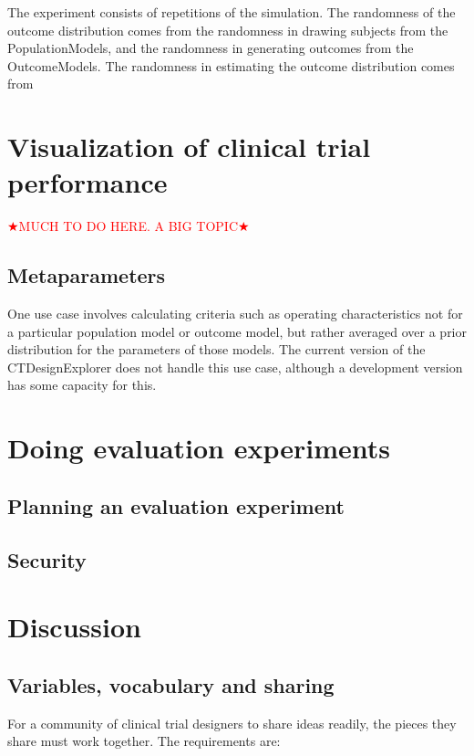\documentclass[12pt]{amsart}
\def\comment<#1>{\textcolor{red}{$\bigstar$#1$\bigstar$}}
\begin{document}
The experiment consists of repetitions of the simulation.
The randomness of the outcome distribution comes from the randomness
in drawing subjects from the PopulationModels, and the randomness in generating outcomes
from the OutcomeModels.
The randomness in estimating the outcome distribution comes from

\section{Visualization of clinical trial performance}

\comment<MUCH TO DO HERE. A BIG TOPIC>


\subsection{Metaparameters}

One use case involves calculating criteria such as operating characteristics not for a particular population model or outcome model, but rather averaged over a prior distribution for the parameters of those models. The current version of the CTDesignExplorer does not handle this use case, although a development version has some capacity for this.


\section{Doing evaluation experiments}

\subsection{Planning an evaluation experiment}

\subsection{Security}

\section{Discussion}

\subsection{Variables, vocabulary and sharing}

For a community of clinical trial designers to share ideas readily, 
the pieces they share must work together.
The requirements are:
\end{document}
